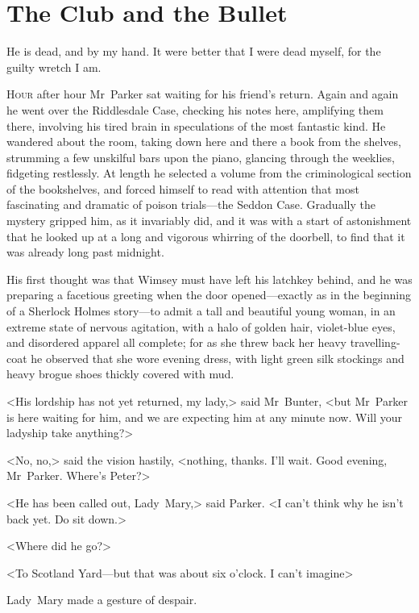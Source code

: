 


\chapter{The Club and the Bullet}

\epigraph{He is dead, and by my hand. It were better that I were dead myself, for the guilty wretch I am.}{}


\lettrine{H}{our} after hour Mr~Parker sat waiting for his friend's return. Again and again he went over the Riddlesdale Case, checking his notes here, amplifying them there, involving his tired brain in speculations of the most fantastic kind. He wandered about the room, taking down here and there a book from the shelves, strumming a few unskilful bars upon the piano, glancing through the weeklies, fidgeting restlessly.  At length he selected a volume from the criminological section of the bookshelves, and forced himself to read with attention that most fascinating and dramatic of poison trials—the Seddon Case. Gradually the mystery gripped him, as it invariably did, and it was with a start of astonishment that he looked up at a long and vigorous whirring of the doorbell, to find that it was already long past midnight.

His first thought was that Wimsey must have left his latchkey behind, and he was preparing a facetious greeting when the door opened—exactly as in the beginning of a Sherlock Holmes story—to admit a tall and beautiful young woman, in an extreme state of nervous agitation, with a halo of golden hair, violet-blue eyes, and disordered apparel all complete; for as she threw back her heavy travelling-coat he observed that she wore evening dress, with light green silk stockings and heavy brogue shoes thickly covered with mud.

<His lordship has not yet returned, my lady,> said Mr~Bunter, <but Mr~Parker is here waiting for him, and we are expecting him at any minute now. Will your ladyship take anything?>

<No, no,> said the vision hastily, <nothing, thanks. I'll wait. Good evening, Mr~Parker. Where's Peter?>

<He has been called out, Lady~Mary,> said Parker. <I can't think why he isn't back yet. Do sit down.>

<Where did he go?>

<To Scotland Yard—but that was about six o'clock. I can't imagine\longdash>

Lady~Mary made a gesture of despair.

